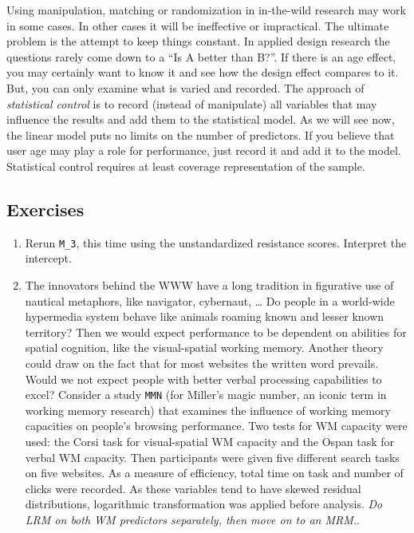 \documentclass[]{svmono}
\theoremstyle{definition}
\theoremstyle{definition}
\theoremstyle{definition}
\theoremstyle{remark}
\begin{document}
Using manipulation, matching or randomization in in-the-wild research
may work in some cases. In other cases it will be ineffective or
impractical. The ultimate problem is the attempt to keep things
constant. In applied design research the questions rarely come down to a
``Is A better than B?''. If there is an age effect, you may certainly
want to know it and see how the design effect compares to it. But, you
can only examine what is varied and recorded. The approach of
\emph{statistical control} is to record (instead of manipulate) all
variables that may influence the results and add them to the statistical
model. As we will see now, the linear model puts no limits on the number
of predictors. If you believe that user age may play a role for
performance, just record it and add it to the model. Statistical control
requires at least coverage representation of the sample.

\subsection{Exercises}\label{exercises-4}

\begin{enumerate}
\def\labelenumi{\arabic{enumi}.}
\item
  Rerun \texttt{M\_3}, this time using the unstandardized resistance
  scores. Interpret the intercept.
\item
  The innovators behind the WWW have a long tradition in figurative use
  of nautical metaphors, like navigator, cybernaut, \ldots{} Do people
  in a world-wide hypermedia system behave like animals roaming known
  and lesser known territory? Then we would expect performance to be
  dependent on abilities for spatial cognition, like the visual-spatial
  working memory. Another theory could draw on the fact that for most
  websites the written word prevails. Would we not expect people with
  better verbal processing capabilities to excel? Consider a study
  \texttt{MMN} (for Miller's magic number, an iconic term in working
  memory research) that examines the influence of working memory
  capacities on people's browsing performance. Two tests for WM capacity
  were used: the Corsi task for visual-spatial WM capacity and the Ospan
  task for verbal WM capacity. Then participants were given five
  different search tasks on five websites. As a measure of efficiency,
  total time on task and number of clicks were recorded. As these
  variables tend to have skewed residual distributions, logarithmic
  transformation was applied before analysis. \emph{Do LRM on both WM
  predictors separately, then move on to an MRM.}.
\end{enumerate}
\end{document}
